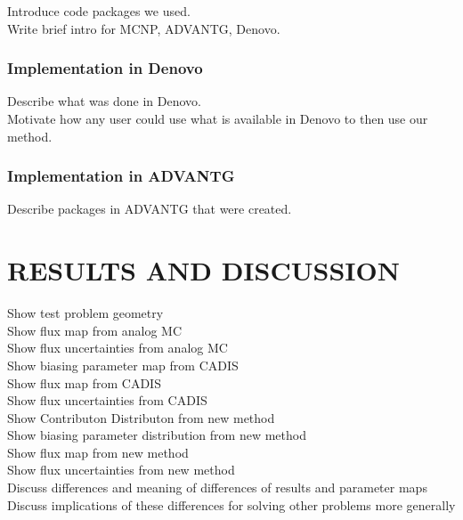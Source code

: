 \documentclass[12pt]{article}
\begin{document}
Introduce code packages we used. \\
Write brief intro for MCNP, ADVANTG, Denovo. \\


%
\subsubsection{Implementation in Denovo} 
\label{subsubsect::minor}

Describe what was done in Denovo. \\
Motivate how any user could use what is available in Denovo to then use our method. \\


%
\subsubsection{Implementation in ADVANTG} 
\label{subsubsect::minor}

Describe packages in ADVANTG that were created. 


%
\section{RESULTS AND DISCUSSION} 
\label{sect::references}

Show test problem geometry
\\ Show flux map from analog MC
\\ Show flux uncertainties from analog MC
\\ Show biasing parameter map from CADIS
\\ Show flux map from CADIS
\\ Show flux uncertainties from CADIS
\\ Show Contributon Distributon from new method
\\ Show biasing parameter distribution from new method
\\ Show flux map from new method
\\ Show flux uncertainties from new method
\\ Discuss differences and meaning of differences of results and parameter maps
\\ Discuss implications of these differences for solving other problems more generally
\end{document}
